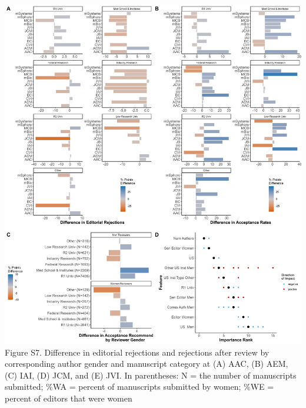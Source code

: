 \documentclass[11pt,]{article}
\begin{document}
\includegraphics{Figure_S7.png} Figure S7. Difference in editorial
rejections and rejections after review by corresponding author gender
and manuscript category at (A) AAC, (B) AEM, (C) IAI, (D) JCM, and (E)
JVI. In parentheses: N = the number of manuscripts submitted; \%WA =
percent of manuscripts submitted by women; \%WE = percent of editors
that were women

\newpage
\end{document}
